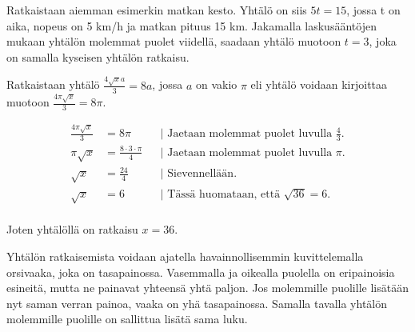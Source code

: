 \begin{esimerkki}
Ratkaistaan aiemman esimerkin matkan kesto. Yhtälö on siis $5t=15$, jossa t on aika, nopeus on 5 km/h ja matkan pituus 15 km. 
Jakamalla laskusääntöjen mukaan yhtälön molemmat puolet viidellä, saadaan yhtälö muotoon $t=3$, joka on samalla kyseisen yhtälön ratkaisu.
\end{esimerkki}


\begin{esimerkki}
Ratkaistaan yhtälö $\frac{4\sqrt{x}a}{3}=8a$, jossa $a$ on vakio $\pi$ eli yhtälö voidaan kirjoittaa muotoon $\frac{4\pi\sqrt{x}}{3}=8\pi$.

		\begin{align*}
			\frac{4 \pi \sqrt{x}}{3} &= 8 {\pi} && \text{| Jaetaan molemmat puolet luvulla $\frac{4}{3}$.} \\
			{\pi}\sqrt{x} &= \frac{8\cdot 3\cdot {\pi}}{4} && \text{| Jaetaan molemmat puolet luvulla $\pi$.} \\
			\sqrt{x} &= \frac{24}{4} && \text{| Sievennellään.} \\
			\sqrt{x} &= 6 && \text{| Tässä huomataan, että $\sqrt{36}=6$.} \\
\end{align*}

Joten yhtälöllä on ratkaisu $x=36$.

\end{esimerkki}

Yhtälön ratkaisemista voidaan ajatella havainnollisemmin kuvittelemalla orsivaaka, joka on tasapainossa.
Vasemmalla ja oikealla puolella on eripainoisia esineitä, mutta ne painavat yhteensä yhtä paljon. 
Jos molemmille puolille lisätään nyt saman verran painoa, vaaka on yhä tasapainossa. Samalla tavalla yhtälön molemmille 
puolille on sallittua lisätä sama luku.

